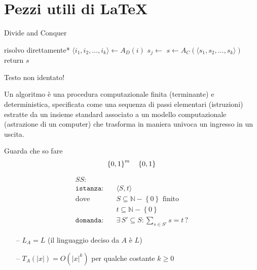 \section{Pezzi utili di \LaTeX{}}
\begin{algorithm}[H]
\caption{Divide and Conquer}\label{alg:dnc}
\begin{algorithmic}[1]
            \State *risolvo direttamente*
        \EndIf
        \State $\langle i_1, i_2, \dots, i_k \rangle \gets A_D(i)$ 
            \State $s_j \gets $ 
        \EndFor
        \State $s \gets A_C(\langle s_1, s_2, \dots, s_k \rangle)$
        \State return $s$
    \EndProcedure
\end{algorithmic}
\end{algorithm}
\noindent
Testo non identato!


\begin{definition}[Algoritmo]\label{def:algex}
    Un algoritmo è una procedura computazionale finita (terminante) e deterministica, specificata come una sequenza di passi elementari (istruzioni) estratte da un insieme standard associato a un modello computazionale (astrazione di un computer) che trasforma in maniera univoca un ingresso in un uscita.
\end{definition}

Guarda che so fare
\begin{equation*}
    \left\{0,1\right\}^{m}
    \quad
    \left\{0,1\right\}^{}
\end{equation*}

\begin{align*}
    SS: & \\
    \texttt{istanza:} \quad & \langle S,t \rangle \\
    \text{dove} \quad & S \subseteq \mathbb{N} - \left\{ 0 \right\} \text{ finito} \\
    & t \subseteq \mathbb{N} - \left\{ 0 \right\} \\
    \texttt{domanda:} \quad & \exists \, S' \subseteq S : \sum_{s \in S'}^{} s = t \, ?
\end{align*}

\begin{itemize}[noitemsep,parsep=0pt,partopsep=0pt,topsep=0pt]
    \item[--] $L_A = L$ (il linguaggio deciso da $A$ è $L$)
    \item[--] $T_A(|x|) = O(|x|^k)$ per qualche costante $k \geq 0$
\end{itemize}
